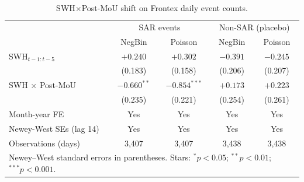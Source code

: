 \begin{table}[H]
\centering
\small
\caption{SWH$\times$Post-MoU shift on Frontex daily event counts.}
\label{tab:appx-frx-events}
\begin{tabular}{lcccc}
\hline
                              & \multicolumn{2}{c}{SAR events} & \multicolumn{2}{c}{Non-SAR (placebo)} \\
                              & NegBin & Poisson & NegBin & Poisson \\
\hline
SWH$_{t-1:t-5}$               & $+0.240$ & $+0.302$ & $-0.391$ & $-0.245$ \\
                              & (0.183) & (0.158) & (0.206) & (0.207) \\
SWH $\times$ Post-MoU         & $-0.660^{**}$ & $-0.854^{***}$ & $+0.173$ & $+0.223$ \\
                              & (0.235) & (0.221) & (0.254) & (0.261) \\
\hline
Month-year FE                 & Yes            & Yes             & Yes      & Yes      \\
Newey-West SEs (lag 14)       & Yes            & Yes             & Yes      & Yes      \\
Observations (days)           & 3,407 & 3,407 & 3,438 & 3,438 \\
\hline
\multicolumn{5}{l}{\footnotesize Newey--West standard errors in parentheses. Stars: $^{*}p<0.05$; $^{**}p<0.01$; $^{***}p<0.001$.} \\
\end{tabular}
\end{table}
